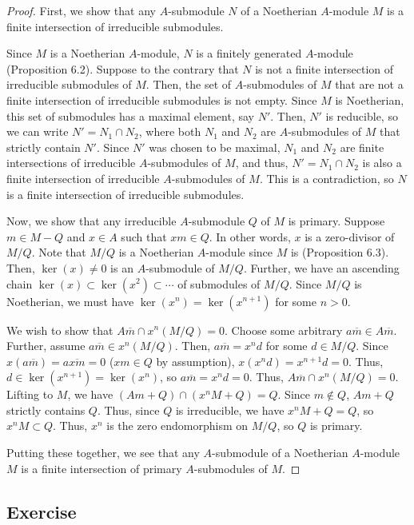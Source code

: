 \begin{proof}
First, we show that any $A$-submodule $N$ of a Noetherian $A$-module $M$ is a finite intersection of irreducible submodules.

Since $M$ is a Noetherian $A$-module, $N$ is a finitely generated $A$-module (Proposition 6.2). Suppose to the contrary that $N$ is not a finite intersection
of irreducible submodules of $M$. Then, the set of $A$-submodules of $M$ that are not a finite intersection of irreducible submodules is not empty. Since $M$ is 
Noetherian, this set of submodules has a maximal element, say $N'$. Then, $N'$ is reducible, so we can write $N' = N_1 \cap N_2$, where both $N_1$ and $N_2$ are
$A$-submodules of $M$ that strictly contain $N'$. Since $N'$ was chosen to be maximal, $N_1$ and $N_2$ are finite intersections of irreducible $A$-submodules of $M$,
and thus, $N' = N_1 \cap N_2$ is also a finite intersection of irreducible $A$-submodules of $M$. This is a contradiction, so $N$ is a finite intersection of
irreducible submodules.

Now, we show that any irreducible $A$-submodule $Q$ of $M$ is primary. Suppose $m \in M - Q$ and $x \in A$ such that $xm \in Q$. In other words, $x$ is a zero-divisor
of $M/Q$. Note that $M/Q$ is a Noetherian $A$-module since $M$ is (Proposition 6.3). Then, $\ker(x) \neq 0$ is an $A$-submodule of $M/Q$. Further, we have an ascending 
chain $\ker(x) \subset \ker(x^2) \subset \cdots$ of submodules of $M/Q$. Since $M/Q$ is Noetherian, we must have $\ker(x^n) = \ker(x^{n+1})$ for some $n > 0$.

We wish to show that $A \overline{m} \cap x^n(M/Q) = 0$. Choose some arbitrary $a \overline{m} \in A \overline{m}$. Further, assume $a \overline{m} \in x^n(M/Q)$. Then,
$a \overline{m} = x^n d$ for some $d \in M/Q$. Since $x (a \overline{m}) = a \overline{xm} = 0$ ($xm \in Q$ by assumption), $x(x^n d) = x^{n+1} d = 0$. Thus, $d \in \ker(x^{n+1})
= \ker(x^n)$, so $a \overline{m} = x^n d = 0$. Thus, $A \overline{m} \cap x^n(M/Q) = 0$. Lifting to $M$, we have $(A m + Q) \cap (x^n M + Q) = Q$. Since $m \not\in Q$, $Am + Q$
strictly contains $Q$. Thus, since $Q$ is irreducible, we have $x^n M + Q = Q$, so $x^n M \subset Q$. Thus, $x^n$ is the zero endomorphism on $M/Q$, so $Q$ is primary.

Putting these together, we see that any $A$-submodule of a Noetherian $A$-module $M$ is a finite intersection of primary $A$-submodules of $M$.
\end{proof}

\subsection{Exercise}\label{7.18}

